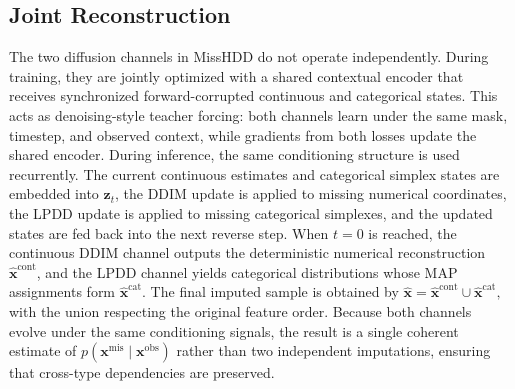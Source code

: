 \documentclass[times, review, 10pt]{elsarticle}
\newcommand{\DIFaddbegin}{\begingroup\color{blue}}
\newcommand{\DIFaddend}{\endgroup}
\begin{document}
\subsection{Joint Reconstruction}

\DIFaddbegin
The two diffusion channels in MissHDD do not operate independently. During
training, they are jointly optimized with a shared contextual encoder that
receives synchronized forward-corrupted continuous and categorical states. This
acts as denoising-style teacher forcing: both channels learn under the same
mask, timestep, and observed context, while gradients from both losses update
the shared encoder. During inference, the same conditioning structure is used
recurrently. The current continuous estimates and categorical simplex states
are embedded into $\mathbf{z}_t$, the DDIM update is applied to missing
numerical coordinates, the LPDD update is applied to missing categorical
simplexes, and the updated states are fed back into the next reverse step. When
$t=0$ is reached, the continuous DDIM channel outputs the deterministic
\DIFaddend
numerical reconstruction $\hat{\mathbf{x}}^{\mathrm{cont}}$, and the LPDD
channel yields categorical distributions whose MAP assignments form
$\hat{\mathbf{x}}^{\mathrm{cat}}$. The final imputed sample is obtained by $ \hat{\mathbf{x}} = \hat{\mathbf{x}}^{\mathrm{cont}}\cup \hat{\mathbf{x}}^{\mathrm{cat}},$ with the union respecting the original feature order. Because both channels evolve under the same conditioning signals, the result is a single coherent estimate of $p(\mathbf{x}^{\mathrm{mis}} \mid \mathbf{x}^{\mathrm{obs}})$ rather than two
independent imputations, ensuring that cross-type dependencies are preserved.
\end{document}
